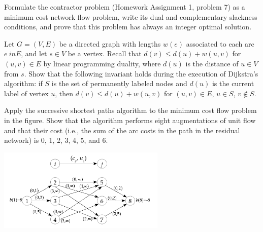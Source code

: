 \documentclass[fleqn]{homework}
\begin{document}
  \begin{problem}{2}
    \begin{question}
      Formulate the contractor problem (Homework Assignment 1, problem 7) as a
      minimum cost network ﬂow problem, write its dual and complementary
      slackness conditions, and prove that this problem has always an integer
      optimal solution.
    \end{question}
  \end{problem}

  \begin{problem}{3}
    \begin{question}
      Let $G=(V, E)$ be a directed graph with lengths $w(e)$ associated to each
      arc $e\ in E$, and let $s \in V$ be a vertex. Recall that
      $d(v) \le d(u) + w(u,v)$ for $(u,v) \in E$ by linear programming duality,
      where $d(u)$ is the distance of $u \in V$ from $s$. Show that the
      following invariant holds during the execution of Dijkstra’s algorithm: if
      $S$ is the set of permanently labeled nodes and $d(u)$ is the current
      label of vertex $u$, then $d(v) \le d(u) + w(u,v)$ for $(u,v) \in E$,
      $u \in S$, $v \not\in S$.
    \end{question}
  \end{problem}

  \begin{problem}{5}
    \begin{question}
      Apply the successive shortest paths algorithm to the minimum cost flow
      problem in the figure. Show that the algorithm performs eight
      augmentations of unit flow and that their cost (i.e., the sum of the arc
      costs in the path in the residual network) is 0, 1, 2, 3, 4, 5, and 6.

      \includegraphics[width=0.6\textwidth]{p5-fig.png}
    \end{question}
  \end{problem}
\end{document}
